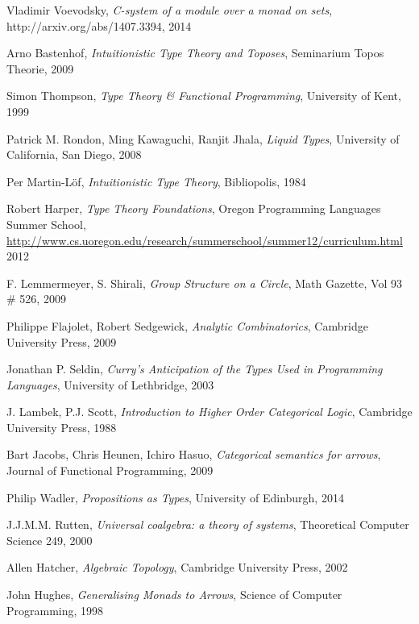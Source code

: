 \documentclass{article}
\begin{document}
\begin{thebibliography}{99}
    Vladimir Voevodsky,
    \emph{C-system of a module over a monad on sets},
    http://arxiv.org/abs/1407.3394,
    2014

    Arno Bastenhof,
    \emph{Intuitionistic Type Theory and Toposes},
    Seminarium Topos Theorie,
    2009

    Simon Thompson,
    \emph{Type Theory \& Functional Programming},
    University of Kent,
    1999

    Patrick M. Rondon, Ming Kawaguchi, Ranjit Jhala,
    \emph{Liquid Types},
    University of California, San Diego,
    2008

    Per Martin-L\"of,
    \emph{Intuitionistic Type Theory},
    Bibliopolis,
    1984

    Robert Harper,
    \emph{Type Theory Foundations},
    Oregon Programming Languages Summer School,
    \url{http://www.cs.uoregon.edu/research/summerschool/summer12/curriculum.html}
    2012

    F. Lemmermeyer, S. Shirali,
    \emph{Group Structure on a Circle},
    Math Gazette, Vol 93 \# 526,
    2009

    Philippe Flajolet, Robert Sedgewick,
    \emph{Analytic Combinatorics},
    Cambridge University Press,
    2009

    Jonathan P. Seldin,
    \emph{Curry's Anticipation of the Types Used in Programming Languages},
    University of Lethbridge,
    2003

    J. Lambek, P.J. Scott,
    \emph{Introduction to Higher Order Categorical Logic},
    Cambridge University Press,
    1988

    Bart Jacobs, Chris Heunen, Ichiro Hasuo,
    \emph{Categorical semantics for arrows},
    Journal of Functional Programming,
    2009

    Philip Wadler,
    \emph{Propositions as Types},
    University of Edinburgh,
    2014

    J.J.M.M. Rutten,
    \emph{Universal coalgebra: a theory of systems},
    Theoretical Computer Science 249,
    2000

    Allen Hatcher,
    \emph{Algebraic Topology},
    Cambridge University Press,
    2002

    John Hughes,
    \emph{Generalising Monads to Arrows},
    Science of Computer Programming,
    1998


\end{thebibliography}
\end{document}
